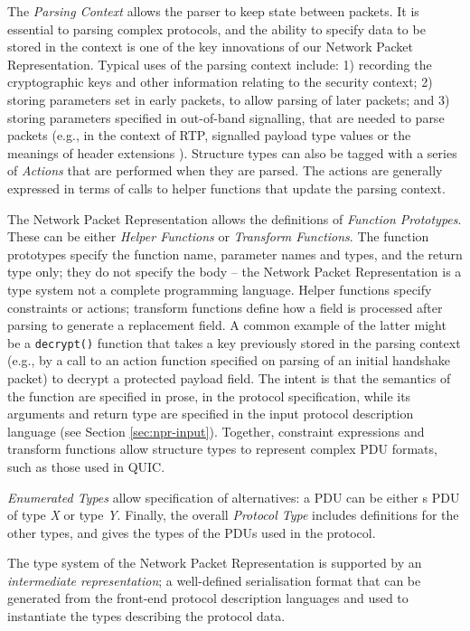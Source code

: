 \documentclass[10pt,sigconf]{acmart}
\begin{document}
The \emph{Parsing Context} allows the parser to keep state between packets.
It is essential to parsing complex protocols, and the ability to specify
data to be stored in the context is one of the key innovations of our
Network Packet Representation.
Typical uses of the parsing context include:
1) recording the cryptographic keys and other information relating to the
   security context;
2) storing parameters set in early packets, to allow parsing of later 
   packets; and
3) storing parameters specified in out-of-band signalling, that are 
   needed to parse packets (e.g., in the context of RTP, signalled
   payload type values or the meanings of header extensions \cite{RFC5285}).
Structure types can also be tagged with a series of \emph{Actions} that are
performed when they are parsed.
The actions are generally expressed in terms of calls to helper functions
that update the parsing context.

The Network Packet Representation allows the definitions of \emph{Function
Prototypes}. These can be either \emph{Helper Functions} or \emph{Transform
Functions}.
The function prototypes specify the function name, parameter names and types,
and the return type only; they do not specify the body -- the Network Packet
Representation is a type system not a complete programming language.
Helper functions specify constraints or actions; transform functions define
how a field is processed after parsing to generate a replacement field.
A common example of the latter might be a \texttt{decrypt()} function that
takes a key previously stored in the parsing context (e.g., by a call to an
action function specified on parsing of an initial handshake packet) to
decrypt a protected payload field.  The intent is that the semantics of the
function are specified in prose, in the protocol specification, while its
arguments and return type are specified in the input protocol description
language (see Section \ref{sec:npr-input}).
Together, constraint expressions and transform functions allow structure
types to represent complex PDU formats, such as those used in QUIC.

\emph{Enumerated Types} allow specification of alternatives: a PDU can
be either s PDU of type \emph{X} or type \emph{Y}. Finally, the overall
\emph{Protocol Type} includes definitions for the other types, and gives
the types of the PDUs used in the protocol.


The type system of the Network Packet Representation is supported by an
\emph{intermediate representation}; a well-defined serialisation format
that can be generated from the front-end protocol description languages
and used to instantiate the types describing the protocol data.
\end{document}
